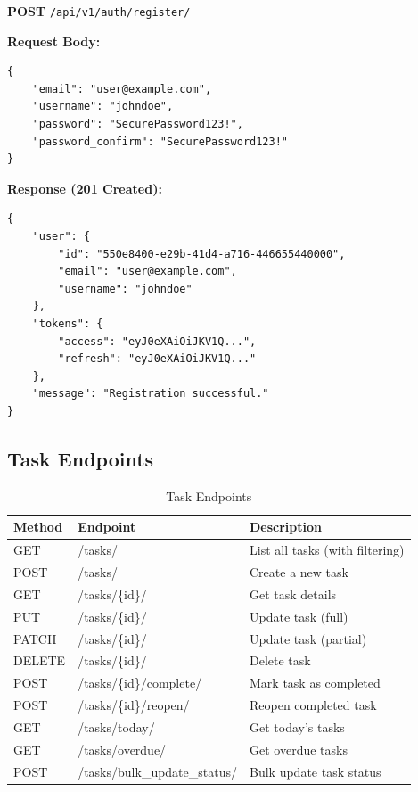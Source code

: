 \documentclass[11pt,a4paper]{article}
\begin{document}
\textbf{POST} \texttt{/api/v1/auth/register/}

\textbf{Request Body:}
\begin{lstlisting}[style=json]
{
    "email": "user@example.com",
    "username": "johndoe",
    "password": "SecurePassword123!",
    "password_confirm": "SecurePassword123!"
}
\end{lstlisting}

\textbf{Response (201 Created):}
\begin{lstlisting}[style=json]
{
    "user": {
        "id": "550e8400-e29b-41d4-a716-446655440000",
        "email": "user@example.com",
        "username": "johndoe"
    },
    "tokens": {
        "access": "eyJ0eXAiOiJKV1Q...",
        "refresh": "eyJ0eXAiOiJKV1Q..."
    },
    "message": "Registration successful."
}
\end{lstlisting}

\subsection{Task Endpoints}

\begin{table}[H]
\centering
\small
\begin{tabular}{@{}llp{6cm}@{}}
\toprule
\textbf{Method} & \textbf{Endpoint} & \textbf{Description} \\
\midrule
GET & /tasks/ & List all tasks (with filtering) \\
POST & /tasks/ & Create a new task \\
GET & /tasks/\{id\}/ & Get task details \\
PUT & /tasks/\{id\}/ & Update task (full) \\
PATCH & /tasks/\{id\}/ & Update task (partial) \\
DELETE & /tasks/\{id\}/ & Delete task \\
POST & /tasks/\{id\}/complete/ & Mark task as completed \\
POST & /tasks/\{id\}/reopen/ & Reopen completed task \\
GET & /tasks/today/ & Get today's tasks \\
GET & /tasks/overdue/ & Get overdue tasks \\
POST & /tasks/bulk\_update\_status/ & Bulk update task status \\
\bottomrule
\end{tabular}
\caption{Task Endpoints}
\end{table}
\end{document}
